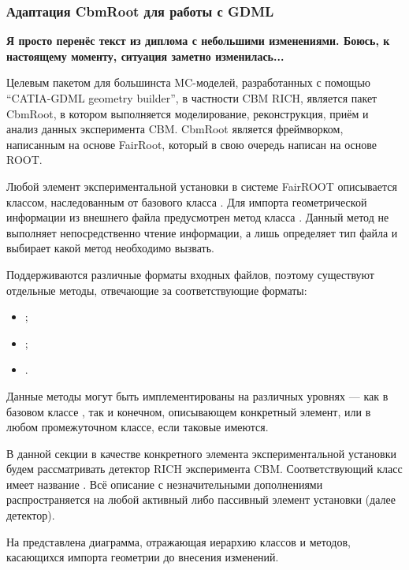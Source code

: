 \subsubsection{Адаптация CbmRoot для работы с GDML}\label{sec:secFairModule}

\textbf{Я просто перенёс текст из диплома с небольшими изменениями. Боюсь, к настоящему моменту, ситуация заметно изменилась...}

Целевым пакетом для большинста MC-моделей, разработанных с помощью ``CATIA-GDML geometry builder'', в частности CBM RICH, является пакет CbmRoot, в котором выполняется моделирование, реконструкция, приём и анализ данных эксперимента CBM. CbmRoot является фреймворком, написанным на основе FairRoot, который в свою очередь написан на основе ROOT.

Любой элемент экспериментальной установки в системе FairROOT описывается классом, наследованным от базового класса . Для импорта геометрической информации из внешнего файла предусмотрен метод  класса . Данный метод не выполняет непосредственно чтение информации, а лишь определяет тип файла и выбирает какой метод необходимо вызвать.

Поддерживаются различные форматы входных файлов, поэтому существуют отдельные методы, отвечающие за соответствующие форматы:

\begin{itemize}
\item {};
\item {};
\item {}.
\end{itemize}

Данные методы могут быть имплементированы на различных уровнях --- как в базовом классе , так и конечном, описывающем конкретный элемент, или в любом промежуточном классе, если таковые имеются.

В данной секции в качестве конкретного элемента экспериментальной установки будем рассматривать детектор RICH эксперимента CBM. Соответствующий класс имеет название . Всё описание с незначительными дополнениями распространяется на любой активный либо пассивный элемент установки (далее детектор).

На  представлена диаграмма, отражающая иерархию классов и методов, касающихся импорта геометрии до внесения изменений.

